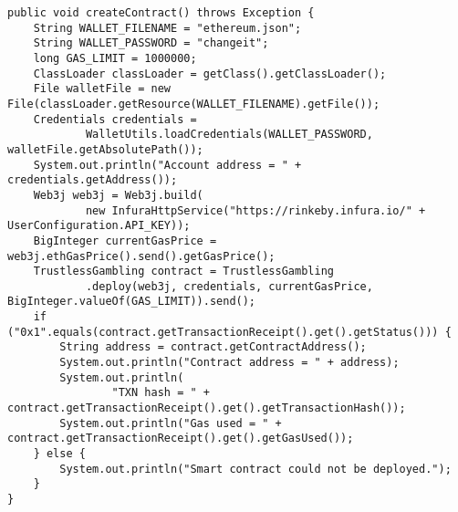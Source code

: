 \begin{lstlisting}
public void createContract() throws Exception {
    String WALLET_FILENAME = "ethereum.json";
    String WALLET_PASSWORD = "changeit";
    long GAS_LIMIT = 1000000;
    ClassLoader classLoader = getClass().getClassLoader();
    File walletFile = new File(classLoader.getResource(WALLET_FILENAME).getFile());
    Credentials credentials =
            WalletUtils.loadCredentials(WALLET_PASSWORD, walletFile.getAbsolutePath());
    System.out.println("Account address = " + credentials.getAddress());
    Web3j web3j = Web3j.build(
            new InfuraHttpService("https://rinkeby.infura.io/" + UserConfiguration.API_KEY));
    BigInteger currentGasPrice = web3j.ethGasPrice().send().getGasPrice();
    TrustlessGambling contract = TrustlessGambling
            .deploy(web3j, credentials, currentGasPrice, BigInteger.valueOf(GAS_LIMIT)).send();
    if ("0x1".equals(contract.getTransactionReceipt().get().getStatus())) {
        String address = contract.getContractAddress();
        System.out.println("Contract address = " + address);
        System.out.println(
                "TXN hash = " + contract.getTransactionReceipt().get().getTransactionHash());
        System.out.println("Gas used = " + contract.getTransactionReceipt().get().getGasUsed());
    } else {
        System.out.println("Smart contract could not be deployed.");
    }
}
\end{lstlisting}